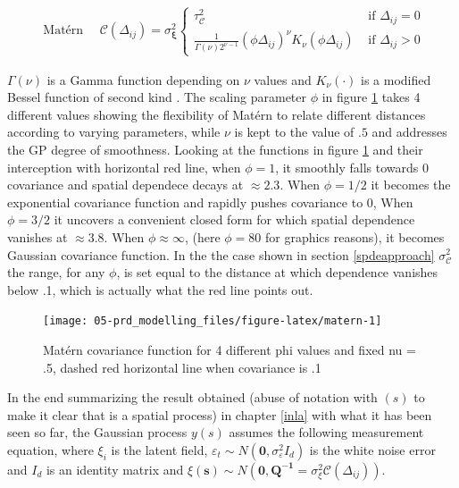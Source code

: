 \documentclass[
  12pt,
  a4paper,
  oneside]{book}
\theoremstyle{definition}
\theoremstyle{definition}
\theoremstyle{definition}
\theoremstyle{remark}
\begin{document}
\[
\begin{aligned}
\text { Matérn } \quad \mathscr{C}( \Delta_{i j})= \sigma_{\mathscr{\boldsymbol{\mathbf{\xi}}}}^{2} \left\{\begin{array}{cl}
\tau^{2}_{\mathscr{C}} & \text { if } \Delta_{i j}=0 \\
\frac{1}{\Gamma(\nu) 2^{\nu-1}}\left(\phi \Delta_{i j}\right)^{\nu} K_{\nu}\left(\phi \Delta_{i j}\right)& \text { if } \Delta_{i j}>0
\end{array}\right.
\end{aligned}
\]

\(\Gamma(\nu)\) is a Gamma function depending on \(\nu\) values and \(K_{\nu}(\cdot)\) is a modified Bessel function of second kind \citep{yaşar2016unified}. The scaling parameter \(\phi\) in figure \ref{fig:matern} takes 4 different values showing the flexibility of Matérn to relate different distances according to varying parameters, while \(\nu\) is kept to the value of \(.5\) and addresses the GP degree of smoothness.
Looking at the functions in figure \ref{fig:matern} and their interception with horizontal red line, when \(\phi = 1\), it smoothly falls towards 0 covariance and spatial dependece decays at \(\approx 2.3\). When \(\phi = 1/2\) it becomes the exponential covariance function and rapidly pushes covariance to 0, When \(\phi = 3/2\) it uncovers a convenient closed form \citep{LecturePaci} for which spatial dependence vanishes at \(\approx 3.8\). When \(\phi \approx \infty\), (here \(\phi = 80\) for graphics reasons), it becomes Gaussian covariance function. In the the case shown in section \ref{spdeapproach} \(\sigma_{\mathscr{C}}^{2}\) the range, for any \(\phi\), is set equal to the distance at which dependence vanishes below .1, which is actually what the red line points out.

\begin{figure}

{\centering \texttt{[image: 05-prd\_modelling\_files/figure-latex/matern-1]} 

}

\caption{Matérn covariance function for 4 different phi values and fixed nu = .5, dashed red horizontal line when covariance is .1}\label{fig:matern}
\end{figure}

In the end summarizing the result obtained (abuse of notation with \((s)\) to make it clear that is a spatial process) in chapter \ref{inla} with what it has been seen so far, the Gaussian process \(y(s)\) assumes the following measurement equation, where \(\xi_{i}\) is the latent field, \(\varepsilon_{t} \sim N\left(\mathbf{0}, \sigma_{\varepsilon}^{2} I_{d}\right)\) is the white noise error and \(I_{d}\) is an identity matrix and \(\xi(\boldsymbol{s})\sim N\left(\mathbf{0}, \boldsymbol{Q^{-1}}=\sigma_{\xi}^{2} \mathscr{C}( \Delta_{i j})\right)\).
\end{document}
